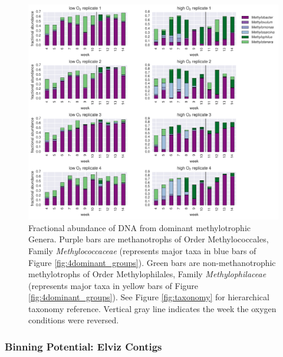 \begin{figure}[H]
\centering
    \includegraphics[width=1.0\textwidth]{./tex/chapter2/figures/170313_methanotroph_methylotroph_taxa--portrait.pdf}  %
    \begin{singlespace}
    \caption[Dominant methanotrophic and methylotrophic Genera]{
        Fractional abundance of DNA from dominant methylotrophic Genera.
        Purple bars are methanotrophs of Order Methylococcales, Family \textit{Methylococcaceae}
            (represents major taxa in blue bars of Figure \ref{fig:4dominant_groups}).
        Green bars are non-methanotrophic methylotrophs of Order Methylophilales, Family \textit{Methylophilaceae}
            (represents major taxa in yellow bars of Figure \ref{fig:4dominant_groups}).
        See Figure \ref{fig:taxonomy} for hierarchical taxonomy reference.
        Vertical gray line indicates the week the oxygen conditions were reversed.
        }  %
    \label{fig:dominant_genera}
    \end{singlespace}
\end{figure}

\subsubsection{Binning Potential: Elviz Contigs}

